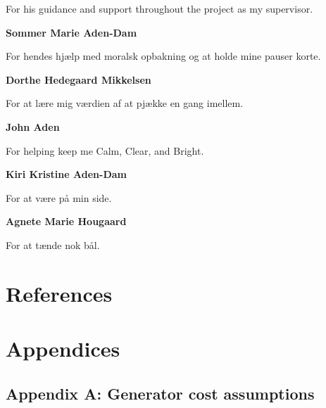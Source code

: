 \documentclass[preprint,12pt,nopreprintline]{elsarticle}
\begin{document}
\medskip
\noindent
For his guidance and support throughout the project as my supervisor.

\medskip
\noindent
\textbf{Sommer Marie Aden-Dam}

\medskip
\noindent
For hendes hjælp med moralsk opbakning og at holde mine pauser korte.

\medskip
\noindent
\textbf{Dorthe Hedegaard Mikkelsen}

\medskip
\noindent
For at lære mig værdien af at pjække en gang imellem.

\medskip
\noindent
\textbf{John Aden}

\medskip
\noindent
For helping keep me Calm, Clear, and Bright.

\medskip
\noindent
\textbf{Kiri Kristine Aden-Dam}

\medskip
\noindent
For at være på min side.

\medskip
\noindent
\textbf{Agnete Marie Hougaard}

\medskip
\noindent
For at tænde nok bål.

\newpage

\section{References}





\newpage

\section{Appendices}

\subsection{Appendix A: Generator cost assumptions} \label{Appendix_A}
\end{document}
